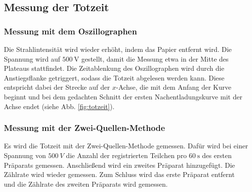 \subsection{Messung der Totzeit}
\subsubsection{Messung mit dem Oszillographen}
Die Strahlintensität wird wieder erhöht, indem das Papier entfernt wird.
Die Spannung wird auf $\SI{500}{\volt}$ gestellt, damit die Messung etwa in der Mitte des Plateaus stattfindet.
Die Zeitablenkung des Oszillographen wird durch die Anstiegsflanke getriggert, sodass die Totzeit abgelesen werden kann. Diese entspricht dabei der Strecke auf der $x$-Achse, die mit dem Anfang der Kurve beginnt und bei dem gedachten Schnitt der ersten Nachentladungskurve mit der Achse endet (siehe Abb. \ref{fig:totzeit}).

\subsubsection{Messung mit der Zwei-Quellen-Methode}
Es wird die Totzeit mit der Zwei-Quellen-Methode gemessen. Dafür wird bei einer Spannung von $\SI{500}{V}$ die Anzahl der registrierten Teilchen pro $\SI{60}{\second}$ des ersten Präparats gemessen. Anschließend wird ein zweites Präparat hinzugefügt. Die Zählrate wird wieder gemessen. Zum Schluss wird das erste Präparat entfernt und die Zählrate des zweiten Präparats wird gemessen.